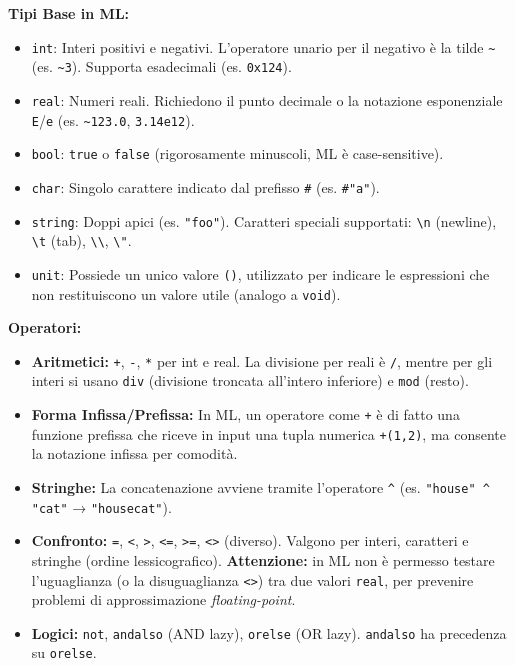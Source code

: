 \documentclass[12pt, a4paper]{article}
\begin{document}
\textbf{Tipi Base in ML:}
\begin{itemize}
\item \texttt{int}: Interi positivi e negativi. L'operatore unario per il negativo è la tilde \texttt{\~{}} (es. \texttt{\~{}3}). Supporta esadecimali (es. \texttt{0x124}).
\item \texttt{real}: Numeri reali. Richiedono il punto decimale o la notazione esponenziale \texttt{E}/\texttt{e} (es. \texttt{\~{}123.0}, \texttt{3.14e12}).
\item \texttt{bool}: \texttt{true} o \texttt{false} (rigorosamente minuscoli, ML è case-sensitive).
\item \texttt{char}: Singolo carattere indicato dal prefisso \texttt{\#} (es. \texttt{\#"a"}).
\item \texttt{string}: Doppi apici (es. \texttt{"foo"}). Caratteri speciali supportati: \texttt{\textbackslash n} (newline), \texttt{\textbackslash t} (tab), \texttt{\textbackslash\textbackslash}, \texttt{\textbackslash"}.
\item \texttt{unit}: Possiede un unico valore \texttt{()}, utilizzato per indicare le espressioni che non restituiscono un valore utile (analogo a \texttt{void}).
\end{itemize}  

\textbf{Operatori:}
\begin{itemize}
\item \textbf{Aritmetici:} \texttt{+}, \texttt{-}, \texttt{*} per int e real. La divisione per reali è \texttt{/}, mentre per gli interi si usano \texttt{div} (divisione troncata all'intero inferiore) e \texttt{mod} (resto).
\item \textbf{Forma Infissa/Prefissa:} In ML, un operatore come \texttt{+} è di fatto una funzione prefissa che riceve in input una tupla numerica \texttt{+(1,2)}, ma consente la notazione infissa per comodità.
\item \textbf{Stringhe:} La concatenazione avviene tramite l'operatore \texttt{\^} (es. \texttt{"house" \^{} "cat"} → \texttt{"housecat"}).
\item \textbf{Confronto:} \texttt{=}, \texttt{<}, \texttt{>}, \texttt{<=}, \texttt{>=}, \texttt{<>} (diverso). Valgono per interi, caratteri e stringhe (ordine lessicografico). \textbf{Attenzione:} in ML non è permesso testare l'uguaglianza (o la disuguaglianza \texttt{<>}) tra due valori \texttt{real}, per prevenire problemi di approssimazione \textit{floating-point}.
\item \textbf{Logici:} \texttt{not}, \texttt{andalso} (AND lazy), \texttt{orelse} (OR lazy). \texttt{andalso} ha precedenza su \texttt{orelse}.
\end{itemize}  
\end{document}
